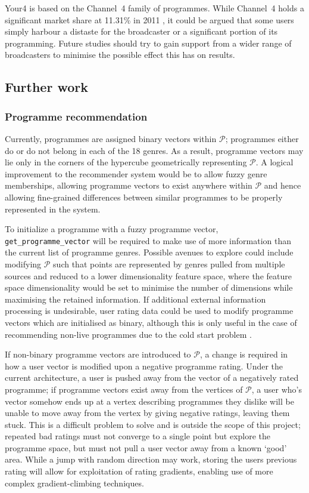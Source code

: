	Your4 is based on the Channel~4 family of programmes. While Channel~4 holds a significant market share at 11.31\% in 2011 \citep{barb-trends}, it could be argued that some users simply harbour a distaste for the broadcaster or a significant portion of its programming. Future studies should try to gain support from a wider range of broadcasters to minimise the possible effect this has on results.

	\subsection{Further work}
		\subsubsection{Programme recommendation}
		\label{sec:further_work_recommender}

		Currently, programmes are assigned binary vectors within $\mathcal{P}$; programmes either do or do not belong in each of the 18 genres. As a result, programme vectors may lie only in the corners of the hypercube geometrically representing $\mathcal{P}$. A logical improvement to the recommender system would be to allow fuzzy genre memberships, allowing programme vectors to exist anywhere within $\mathcal{P}$ and hence allowing fine-grained differences between similar programmes to be properly represented in the system.
		
		To initialize a programme with a fuzzy programme vector, \texttt{get\_programme\_vector} will be required to make use of more information than the current list of programme genres. Possible avenues to explore could include modifying $\mathcal{P}$ such that points are represented by genres pulled from multiple sources and reduced to a lower dimensionality feature space, where the feature space dimensionality would be set to minimise the number of dimensions while maximising the retained information. If additional external information processing is undesirable, user rating data could be used to modify programme vectors which are initialised as binary, although this is only useful in the case of recommending non-live programmes due to the cold start problem \citep{cold-start-problem}.

		If non-binary programme vectors are introduced to $\mathcal{P}$, a change is required in how a user vector is modified upon a negative programme rating. Under the current architecture, a user is pushed away from the vector of a negatively rated programme; if programme vectors exist away from the vertices of $\mathcal{P}$, a user who's vector somehow ends up at a vertex describing programmes they dislike will be unable to move away from the vertex by giving negative ratings, leaving them stuck. This is a difficult problem to solve and is outside the scope of this project; repeated bad ratings must not converge to a single point but explore the programme space, but must not pull a user vector away from a known `good' area. While a jump with random direction may work, storing the users previous rating will allow for exploitation of rating gradients, enabling use of more complex gradient-climbing techniques.

